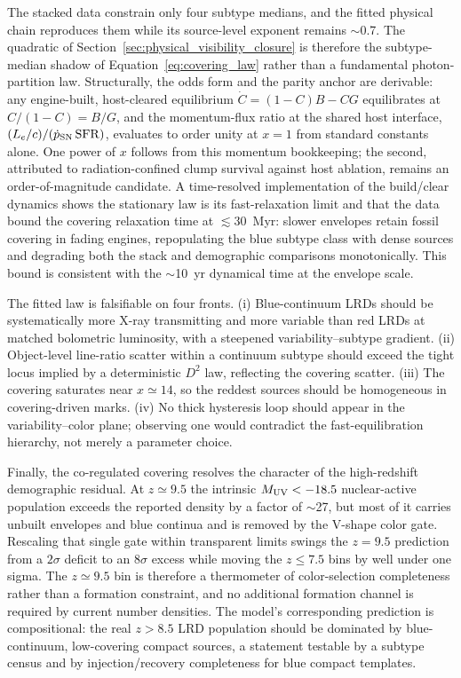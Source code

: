 The stacked data constrain only four subtype medians, and the fitted
physical chain reproduces them while its source-level exponent remains
$\sim$0.7. The quadratic of Section~\ref{sec:physical_visibility_closure} is
therefore the subtype-median shadow of Equation~\ref{eq:covering_law}
rather than a fundamental photon-partition law. Structurally, the odds form
and the parity anchor are derivable: any engine-built, host-cleared
equilibrium $\dot C=(1-C)B-CG$ equilibrates at $C/(1-C)=B/G$, and the
momentum-flux ratio at the shared host interface,
$(L_e/c)/(\dot p_{\rm SN}\,\mathrm{SFR})$, evaluates to order unity at
$x=1$ from standard constants alone. One power of $x$ follows from this
momentum bookkeeping; the second, attributed to radiation-confined clump
survival against host ablation, remains an order-of-magnitude candidate. A
time-resolved implementation of the build/clear dynamics shows the
stationary law is its fast-relaxation limit and that the data bound the
covering relaxation time at $\lesssim30$~Myr: slower envelopes retain
fossil covering in fading engines, repopulating the blue subtype class with
dense sources and degrading both the stack and demographic comparisons
monotonically. This bound is consistent with the $\sim$10~yr dynamical time
at the envelope scale.

The fitted law is falsifiable on four fronts. (i) Blue-continuum LRDs
should be systematically more X-ray transmitting and more variable than red
LRDs at matched bolometric luminosity, with a steepened
variability--subtype gradient. (ii) Object-level line-ratio scatter within
a continuum subtype should exceed the tight locus implied by a
deterministic $D^2$ law, reflecting the covering scatter. (iii) The
covering saturates near $x\simeq14$, so the reddest sources should be
homogeneous in covering-driven marks. (iv) No thick hysteresis loop should
appear in the variability--color plane; observing one would contradict the
fast-equilibration hierarchy, not merely a parameter choice.

Finally, the co-regulated covering resolves the character of the
high-redshift demographic residual. At $z\simeq9.5$ the intrinsic
$M_{\rm UV}<-18.5$ nuclear-active population exceeds the reported density
by a factor of $\sim$27, but most of it carries unbuilt envelopes and blue
continua and is removed by the V-shape color gate. Rescaling that single
gate within transparent limits swings the $z=9.5$ prediction from a
$2\sigma$ deficit to an $8\sigma$ excess while moving the $z\le7.5$ bins by
well under one sigma. The $z\simeq9.5$ bin is therefore a thermometer of
color-selection completeness rather than a formation constraint, and no
additional formation channel is required by current number densities. The
model's corresponding prediction is compositional: the real $z>8.5$ LRD
population should be dominated by blue-continuum, low-covering compact
sources, a statement testable by a subtype census and by injection/recovery
completeness for blue compact templates.
